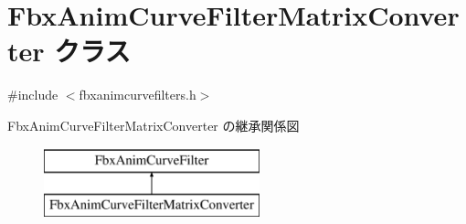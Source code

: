 \hypertarget{class_fbx_anim_curve_filter_matrix_converter}{}\section{Fbx\+Anim\+Curve\+Filter\+Matrix\+Converter クラス}
\label{class_fbx_anim_curve_filter_matrix_converter}


{\ttfamily \#include $<$fbxanimcurvefilters.\+h$>$}

Fbx\+Anim\+Curve\+Filter\+Matrix\+Converter の継承関係図\begin{figure}[H]
\begin{center}
\leavevmode
\includegraphics[height=2.000000cm]{class_fbx_anim_curve_filter_matrix_converter}
\end{center}
\end{figure}
